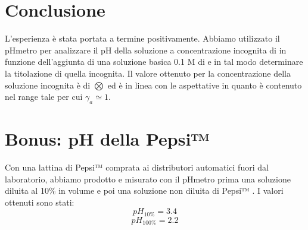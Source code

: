 \section*{Conclusione}

L'esperienza è stata portata a termine positivamente.
Abbiamo utilizzato il pHmetro per analizzare il pH della soluzione a concentrazione incognita di  in funzione dell'aggiunta di una soluzione basica 0.1 M di  e in tal modo determinare la titolazione di quella incognita.
Il valore ottenuto per la concentrazione della soluzione incognita è di $\bigotimes$ ed è in linea con le aspettative in quanto è contenuto nel range tale per cui $\gamma_{a} \simeq 1$.

\section*{Bonus: pH della Pepsi™}

Con una lattina di Pepsi™ comprata ai distributori automatici fuori dal laboratorio, abbiamo prodotto e misurato con il pHmetro prima una soluzione diluita al 10\% in volume e poi una soluzione non diluita di Pepsi™ .
I valori ottenuti sono stati:
$$pH_{10\%} = 3.4$$
$$pH_{100\%} = 2.2$$